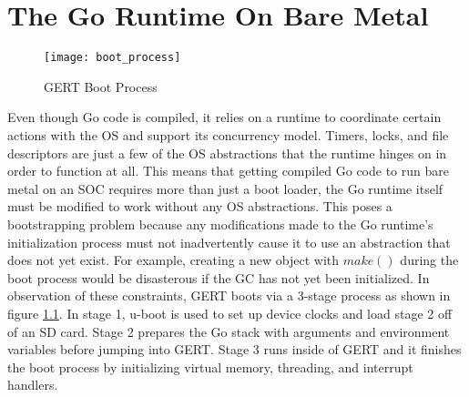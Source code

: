 \chapter{The Go Runtime On Bare Metal}

\begin{figure}[h]
\begin{center}
  \texttt{[image: boot\_process]}
\end{center}
  \caption{GERT Boot Process} \label{fig:boot}
\end{figure}

Even though Go code is compiled, it relies on a runtime to coordinate certain actions with the OS and support its concurrency model.
Timers, locks, and file descriptors are just a few of the OS abstractions that the runtime hinges on
in order to function at all. This means that getting compiled Go code to run bare metal on an SOC requires
more than just a boot loader, the Go runtime itself must be modified to work without any OS abstractions.
This poses a bootstrapping problem because any modifications made to the Go runtime's initialization
process must not inadvertently cause it to use an abstraction that does not yet exist. For example,
creating a new object with $make()$ during the boot process would be disasterous if the GC has not yet been initialized.
In observation of these constraints, GERT boots via a 3-stage process as shown in  figure \ref{fig:boot}.
In stage 1, u-boot is used to set up device clocks and load stage 2 off of an SD card. Stage 2 prepares the
Go stack with arguments and environment variables before jumping into GERT. Stage 3 runs inside of GERT and it
finishes the boot process by initializing virtual memory, threading, and interrupt handlers.








